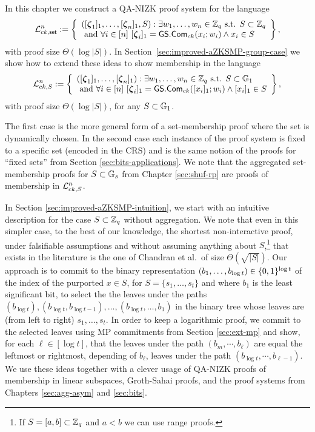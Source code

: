 \newcommand{\setsize}{t}

In this chapter we construct a QA-NIZK proof system for the language
\[
\Lang_{ck,\mathsf{set}}^n:=\left\{\begin{array}{l}
([\grkb{\zeta}_1]_1,\ldots,[\grkb{\zeta}_n]_1,S):\exists w_1,\ldots,w_n\in\Z_q \text{ s.t. } S\subset\Z_q\\
\text{ and } \forall i\in [n]\ [\grkb{\zeta}_i]_1=\GS.\Com_{ck}(x_i;w_i)\wedge x_i\in S
\end{array}\right\},
\]
with proof size $\Theta(\log |S|)$. In Section~\ref{sec:improved-aZKSMP-group-case} we show how to extend these ideas to show membership in the language
\[
\Lang_{ck,S}^n:=\left\{\begin{array}{l}
([\grkb{\zeta}_1]_1,\ldots,[\grkb{\zeta}_n]_1):\exists w_1,\ldots,w_n\in\Z_q \text{ s.t. } S\subset\GG_1 \\
\text{ and } \forall i\in [n]\ [\grkb{\zeta}_i]_1=\GS.\Com_{ck}([x_i]_1;w_i)\wedge [x_i]_1\in S
\end{array}\right\},
\]
with proof size $\Theta(\log |S|)$, for any \(S\subset\mathbb{G}_1\).

The first case is the more general form of a set-membership proof where the set is dynamically chosen. In the second case each instance of the proof system is fixed to a specific set (encoded in the CRS) and is the same notion of the proofs for ``fixed sets'' from Section \ref{sec:bits-applications}. We note that the aggregated set-membership proofs for $S\subset\mathbb{G}_s$ from Chapter \ref{sec:shuf-rp} are proofs of membership in $\mathcal{L}_{ck,S}^n$.

In Section \ref{sec:improved-aZKSMP-intuition}, we start with an intuitive description for the case $S\subset\mathbb{Z}_q$ without aggregation. We note that even in this simpler case, to the best of our knowledge, the shortest non-interactive proof, under falsifiable assumptions and without assuming anything about $S$,\footnote{If $S=[a,b]\subset\mathbb{Z}_q$ and $a<b$ we can use range proofs.} that exists in the literature is the one of Chandran et al.~of size $\Theta(\sqrt{|S|})$.
Our approach is to commit to the binary representation $(b_1,\ldots,b_{\log t})\in\{0,1\}^{\log t}$ of the index of the purported $x\in S$, for $S=\{s_1,\ldots,s_t\}$ and where $b_1$ is the least significant bit, to select the the leaves under the paths $(b_{\log t}),(b_{\log t},b_{\log t-1}),\ldots,(b_{\log t},\ldots, b_1)$ in the binary tree whose leaves are (from left to right) $s_1,\ldots,s_t$. In order to keep a logarithmic proof, we commit to the selected leaves using MP commitments from Section \ref{sec:ext-mp} and show, for each $\ell\in[\log t]$, that the leaves under the path $(b_m,\cdots, b_{\ell})$ are equal the leftmost or rightmost, depending of $b_\ell$, leaves under the path $(b_{\log t},\cdots, b_{\ell-1})$. We use these ideas together with a clever usage of QA-NIZK proofs of membership in linear subspaces, Groth-Sahai proofs, and the proof systems from Chapters \ref{sec:agg-asym} and \ref{sec:bits}.


